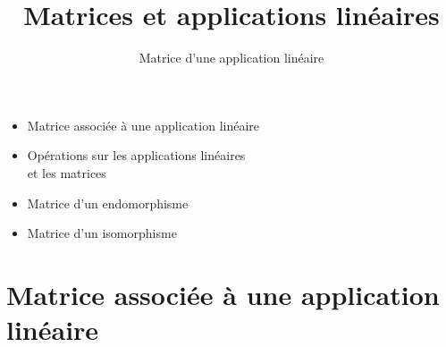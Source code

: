 

 
   





\title{{\bf Matrices et applications linéaires}}
\subtitle{Matrice d'une application linéaire}

\begin{frame}
  
  \debutmontitre

  \pause

{\footnotesize
\hfill
{}
\begin{minipage}{0.6\textwidth}
  \begin{itemize}
    \item<3-> Matrice associée à une application linéaire
    \item<4-> Opérations sur les applications linéaires \\ et les matrices
    \item<5-> Matrice d'un endomorphisme
    \item<6-> Matrice d'un isomorphisme
  \end{itemize}
\end{minipage}
}

\end{frame}

\setcounter{framenumber}{0}


\section{Matrice associée à une application linéaire}

